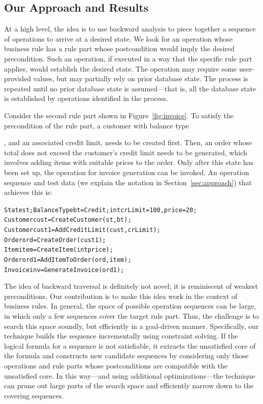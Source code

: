 \subsection{Our Approach and Results}

At a high level, the idea is to use backward analysis to piece together a
sequence of operations to arrive at a desired state.  We look for an operation
whose business rule has a rule part whose postcondition would imply the desired
precondition.  Such an operation, if executed in a way that the specific rule
part applies, would establish the desired state.  The operation may require some
user-provided values, but may partially rely on prior database state. The
process is repeated until no prior database state is assumed---that is, all the
database state is established by operations identified in the process.

Consider the second rule part shown in Figure~\ref{fig:invoice}. To satisfy the
precondition of the rule part, a customer with balance type \subject{Credit},
and an associated credit limit, needs to be created first. Then, an order whose
total does not exceed the customer's credit limit needs to be generated, which
involves adding items with suitable prices to the order. Only after this state
has been set up, the operation for invoice generation can be invoked. An
operation sequence and test data (we explain the notation in
Section~\ref{sec:approach}) that achieves this is:

\vspace*{-4pt}%
{\scriptsize
\begin{alltt}
 State st; BalanceType bt = Credit; int crLimit = 100, price = 20;
 Customer cust = CreateCustomer(st, bt);
 Customer cust1 = AddCreditLimit(cust, crLimit);
 Order ord = CreateOrder(cust1);
 Item item = CreateItem(int price);
 Order ord1 = AddItemToOrder(ord, item);
 Invoice inv = GenerateInvoice(ord1);  
\end{alltt}}%
\vspace*{-5pt}

The idea of backward traversal is definitely not novel; it is reminiscent of
weakest preconditions.  Our contribution is to make this idea work in the
context of business rules.  In general, the space of possible operation
sequences can be large, in which only a few sequences cover the target rule
part. Thus, the challenge is to search this space soundly, but efficiently in a
goal-driven manner. Specifically, our technique builds the sequence
incrementally using constraint solving. If the logical formula for a sequence is
not satisfiable, it extracts the unsatisfied core of the formula and constructs
new candidate sequences by considering only those operations and rule parts
whose postconditions are compatible with the unsatisfied core. In this way---and
using additional optimizations---the technique can prune out large parts of the
search space and efficiently narrow down to the covering sequences.

